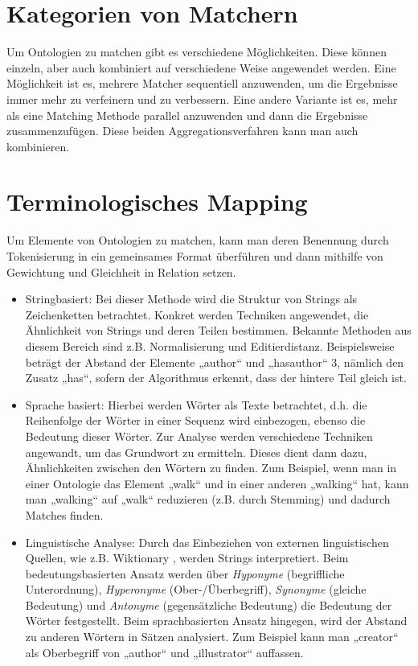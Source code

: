 	\section{Kategorien von Matchern}
	Um Ontologien zu matchen gibt es verschiedene Möglichkeiten. Diese können einzeln, aber auch kombiniert auf verschiedene Weise angewendet werden. Eine Möglichkeit ist es, mehrere Matcher sequentiell anzuwenden, um die Ergebnisse immer mehr zu verfeinern und zu verbessern. Eine andere Variante ist es, mehr als eine Matching Methode parallel anzuwenden und dann die Ergebnisse zusammenzufügen. Diese beiden Aggregationsverfahren kann man auch kombinieren. \cite{Hoo14}
	
	\section{Terminologisches Mapping}
	Um Elemente von Ontologien zu matchen, kann man deren Benennung durch Tokenisierung in ein gemeinsames Format überführen und dann mithilfe von Gewichtung und Gleichheit in Relation setzen.
	\begin{itemize}
		\item Stringbasiert: Bei dieser Methode wird die Struktur von Strings als
		Zeichenketten betrachtet. Konkret werden Techniken angewendet, die Ähnlichkeit von Strings und deren Teilen bestimmen. Bekannte Methoden aus diesem Bereich sind z.B. Normalisierung und Editierdistanz. \cite{Euz07}  Beispielsweise beträgt der Abstand der Elemente „author“ und „hasauthor“ 3, nämlich den Zusatz „has“, sofern der Algorithmus erkennt, dass der hintere Teil gleich ist.
		\item  Sprache basiert: Hierbei werden Wörter als Texte betrachtet, d.h. die
		Reihenfolge der Wörter in einer Sequenz wird einbezogen, ebenso die Bedeutung dieser Wörter. Zur Analyse werden verschiedene Techniken angewandt, um das Grundwort zu ermitteln. Dieses dient dann dazu, Ähnlichkeiten zwischen den Wörtern zu finden. \cite{Euz07}  Zum Beispiel, wenn man in einer Ontologie das Element „walk“ und in einer anderen „walking“ hat, kann man „walking“ auf „walk“ reduzieren (z.B. durch Stemming) und dadurch Matches finden.
		\item Linguistische Analyse: Durch das Einbeziehen von externen
		linguistischen Quellen, wie z.B. Wiktionary , werden Strings interpretiert.
		Beim bedeutungsbasierten Ansatz werden über \textit{Hyponyme} (begriffliche
		Unterordnung), \textit{Hyperonyme} (Ober-/Überbegriff), \textit{Synonyme}
		(gleiche Bedeutung) und \textit{Antonyme} (gegensätzliche Bedeutung) die
		Bedeutung der Wörter festgestellt. Beim sprachbasierten Ansatz hingegen, wird der Abstand zu anderen Wörtern in Sätzen analysiert. \cite{Euz07} Zum Beispiel kann man „creator“ als Oberbegriff von „author“ und „illustrator“ auffassen.
	\end{itemize}
	
